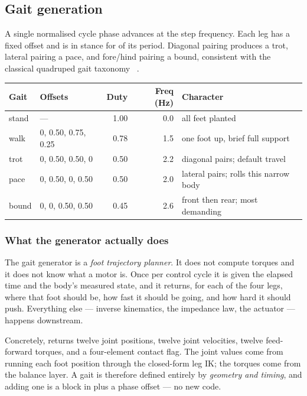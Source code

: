 \documentclass[11pt,a4paper]{article}
\begin{document}
\subsection{Gait generation}

A single normalised cycle phase advances at the step frequency. Each leg has a
fixed offset and is in stance for  of its period.
Diagonal pairing produces a trot, lateral pairing a pace, and fore/hind pairing
a bound, consistent with the classical quadruped gait taxonomy
~\cite{raibert-gaits}.

\begin{center}\small
\begin{tabular}{@{}llrrl@{}}
\toprule
\textbf{Gait} & \textbf{Offsets} & \textbf{Duty} & \textbf{Freq (Hz)} & \textbf{Character} \\
\midrule
stand & ---                     & 1.00 & 0.0 & all feet planted \\
walk  & 0, 0.50, 0.75, 0.25     & 0.78 & 1.5 & one foot up, brief full support \\
trot  & 0, 0.50, 0.50, 0        & 0.50 & 2.2 & diagonal pairs; default travel \\
pace  & 0, 0.50, 0, 0.50        & 0.50 & 2.0 & lateral pairs; rolls this narrow body \\
bound & 0, 0, 0.50, 0.50        & 0.45 & 2.6 & front then rear; most demanding \\
\bottomrule
\end{tabular}
\end{center}

\subsubsection{What the generator actually does}

The gait generator is a \emph{foot trajectory planner}. It does not compute
torques and it does not know what a motor is. Once per control cycle it is
given the elapsed time and the body's measured state, and it returns, for each
of the four legs, where that foot should be, how fast it should be going, and
how hard it should push. Everything else --- inverse kinematics, the impedance
law, the actuator --- happens downstream.

Concretely,  returns twelve joint
positions, twelve joint velocities, twelve feed-forward torques, and a
four-element contact flag. The joint values come from running each foot
position through the closed-form leg IK; the torques come from the balance
layer. A gait is therefore defined entirely by \emph{geometry and timing}, and
adding one is a block in  plus a phase offset --- no new code.
\end{document}
